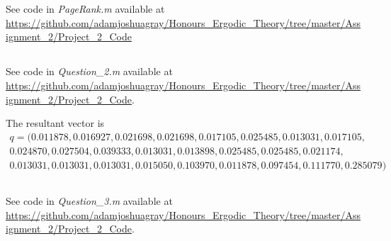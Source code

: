 \documentclass{unswmaths}
\begin{document}
\section{}
\subsection{}
See code in \emph{PageRank.m} available at \url{https://github.com/adamjoshuagray/Honours_Ergodic_Theory/tree/master/Assignment_2/Project_2_Code}

\subsection{}
See code in \emph{Question\_2.m} available at \url{https://github.com/adamjoshuagray/Honours_Ergodic_Theory/tree/master/Assignment_2/Project_2_Code}. 

The resultant vector is
\begin{align*}    q =
(  0.011878,
   0.016927,
   0.021698,
   0.021698,
   0.017105,
   0.025485,
   0.013031,
   0.017105, \\
   0.024870,
   0.027504,
   0.039333,
   0.013031,
   0.013898,
   0.025485,
   0.025485,
   0.021174, \\
   0.013031,
   0.013031,
   0.013031,
   0.015050,
   0.103970,
   0.011878,
   0.097454,
   0.111770,
   0.285079
)
\end{align*}
\subsection{}
See code in \emph{Question\_3.m} available at \url{https://github.com/adamjoshuagray/Honours_Ergodic_Theory/tree/master/Assignment_2/Project_2_Code}. 
\end{document}
